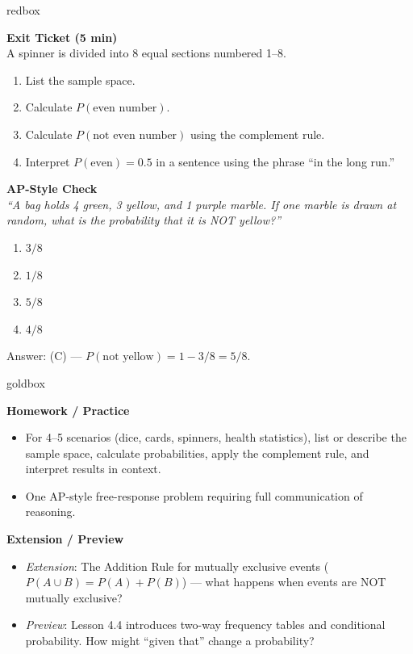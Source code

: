 \documentclass[10pt]{article}
\begin{document}
\begin{skillbox}{redbox}
\begin{minipage}[t]{0.48\linewidth}
    \textbf{Exit Ticket (5 min)}\\
    A spinner is divided into 8 equal sections numbered 1--8.
    \begin{enumerate}
        \item List the sample space.
        \item Calculate $P(\text{even number})$.
        \item Calculate $P(\text{not even number})$ using the complement rule.
        \item Interpret $P(\text{even}) = 0.5$ in a sentence using the phrase
              ``in the long run.''
    \end{enumerate}
\end{minipage}
\hfill
\begin{minipage}[t]{0.48\linewidth}
    \textbf{AP-Style Check}\\
    \textit{``A bag holds 4 green, 3 yellow, and 1 purple marble. If one marble is
    drawn at random, what is the probability that it is NOT yellow?''}
    \begin{enumerate}[label=(\Alph*)]
        \item $3/8$
        \item $1/8$
        \item $5/8$
        \item $4/8$
    \end{enumerate}
    Answer: (C) --- $P(\text{not yellow}) = 1 - 3/8 = 5/8$.
\end{minipage}
\end{skillbox}

\begin{skillbox}{goldbox}
\begin{minipage}[t]{0.48\linewidth}
    \textbf{Homework / Practice}
    \begin{itemize}
        \item For 4--5 scenarios (dice, cards, spinners, health statistics), list or
              describe the sample space, calculate probabilities, apply the complement
              rule, and interpret results in context.
        \item One AP-style free-response problem requiring full communication of reasoning.
    \end{itemize}
\end{minipage}
\hfill
\begin{minipage}[t]{0.48\linewidth}
    \textbf{Extension / Preview}
    \begin{itemize}
        \item \textit{Extension}: The Addition Rule for mutually exclusive events
              ($P(A \cup B) = P(A) + P(B)$) --- what happens when events are NOT mutually
              exclusive?
        \item \textit{Preview}: Lesson 4.4 introduces two-way frequency tables and
              conditional probability. How might ``given that'' change a probability?
    \end{itemize}
\end{minipage}
\end{skillbox}
\end{document}
